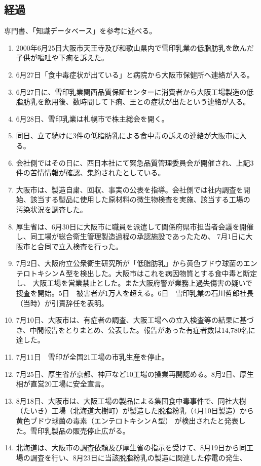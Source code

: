 \documentclass[twocolumn,titlepage]{jsarticle}
\begin{document}
\subsection{経過}
専門書\cite{rakujitu}、「知識データベース」を参考に述べる。
\begin{enumerate}
 \item 2000年6月25日大阪市天王寺及び和歌山県内で雪印乳業の低脂肪乳を飲んだ子供が嘔吐や下痢を訴えた。
 \item 6月27日「食中毒症状が出ている」と病院から大阪市保健所へ連絡が入る。
 \item 6月27日に、雪印乳業関西品質保証センターに消費者から大阪工場製造の低脂肪乳を飲用後、数時間して下痢、王との症状が出たという連絡が入る。
 \item 6月28日、雪印乳業は札幌市で株主総会を開く。
 \item 同日、立て続けに3件の低脂肪乳による食中毒の訴えの連絡が大阪市に入る。
 \item 会社側ではその日に、西日本社にて緊急品質管理委員会が開催され、上記3件の苦情情報が確認、集約されたとしている。
 \item 大阪市は、製造自粛、回収、事実の公表を指導。会社側では社内調査を開始、該当する製品に使用した原材料の微生物検査を実施、該当する工場の
 汚染状況を調査した。
 \item 厚生省は、6月30日に大阪市に職員を派遣して関係府県市担当者会議を開催し、同工場が総合衛生管理製造過程の承認施設であったため、
 7月1日に大阪市と合同で立入検査を行った。
 \item 7月2日、大阪府立公衆衛生研究所が「低脂肪乳」から黄色ブドウ球菌のエンテロトキシンＡ型を検出した。大阪市はこれを病因物質とする食中毒と断定し、
 大阪工場を営業禁止とした。また大阪府警が業務上過失傷害の疑いで捜査を開始。5日　被害者が1万人を超える。6日　雪印乳業の石川哲郎社長（当時）が引責辞任を表明。
 \item 7月10日、大阪市は、有症者の調査、大阪工場への立入検査等の結果に基づき、中間報告をとりまとめ、公表した。報告があった有症者数は14,780名に達した。
 \item 7月11日　雪印が全国21工場の市乳生産を停止。
 \item 7月25日、厚生省が京都、神戸など10工場の操業再開認める。8月2日、厚生相が直営20工場に安全宣言。
 \item 8月18日、大阪市は、大阪工場の製品による集団食中毒事件で、同社大樹（たいき）工場（北海道大樹町）が製造した脱脂粉乳（4月10日製造）から黄色ブドウ球菌の毒素（エンテロトキシンＡ型）
 が検出されたと発表した。雪印乳製品の販売停止広がる。
 \item 北海道は、大阪市の調査依頼及び厚生省の指示を受けて、8月19日から同工場の調査を行い、8月23日に当該脱脂粉乳の製造に関連した停電の発生、

\end{enumerate}
\end{document}
